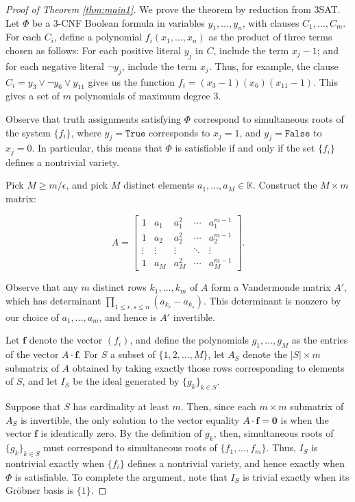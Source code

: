 \documentclass{article}
\newcommand{\K}[0]{\mathbb{K}}
\newcommand{\ep}[0]{\epsilon}
\begin{document}
\begin{proof}[Proof of Theorem \ref{thm:main1}]
We prove the theorem by reduction from 3SAT.  Let $\Phi$ be a 3\nobreakdash-CNF Boolean formula in variables $y_1,\ldots,y_n$, with clauses $C_1, \ldots, C_m$. For each $C_i$, define a polynomial $f_i(x_1,\ldots,x_n)$ as the product of three terms chosen as follows: For each positive literal $y_j$ in $C$, include the term $x_j-1$; and for each negative literal $\neg y_j$, include the term $x_j$. Thus, for example, the clause $C_i = y_3\vee \neg y_6\vee y_{11}$ gives us the function $f_i = (x_3 - 1)(x_6)(x_{11} - 1)$. This gives a set of $m$ polynomials of maximum degree 3.

Observe that truth assignments satisfying $\Phi$ correspond to simultaneous roots of the system $\{f_i\}$, where $y_j = \texttt{True}$ corresponds to $x_j = 1$, and $y_j = \texttt{False}$ to $x_j = 0$. In particular, this means that $\Phi$ is satisfiable if and only if the set $\{f_i\}$ defines a nontrivial variety.

Pick $M \ge m/\ep$, and pick $M$ distinct elements $a_1,\ldots,a_M \in \K$.  Construct the $M \times m$ matrix:

$$A = \left[\begin{array}{ccccc}
1 & a_1 & a_1^2 & \cdots & a_1^{m-1} \\
1 & a_2 & a_2^2 & \cdots & a_2^{m-1} \\
\vdots & \vdots & \vdots & \ddots & \vdots \\
1 & a_M & a_M^2 & \cdots & a_M^{m-1}
\end{array}\right].$$

Observe that any $m$ distinct rows $k_1,\ldots,k_m$ of $A$ form a Vandermonde matrix $A'$, which has determinant $\prod_{1\le r, s\le n} (a_{k_r} - a_{k_s})$.  This determinant is nonzero by our choice of $a_1, \ldots, a_m$, and hence is $A'$ invertible.

Let $\textbf{f}$ denote the vector $(f_i)$, and define the polynomials $g_1, \ldots, g_M$ as the entries of the vector $A\cdot \textbf{f}$.  For $S$ a subset of $\{1,2,\ldots, M\}$, let $A_S$ denote the $|S|\times m$ submatrix of $A$ obtained by taking exactly those rows corresponding to elements of $S$, and let $I_S$ be the ideal generated by $\{g_k\}_{k\in S}$.

Suppose that $S$ has cardinality at least $m$. Then, since each $m\times m$ submatrix of $A_S$ is invertible, the only solution to the vector equality $A\cdot \textbf{f} = \textbf{0}$ is when the vector $\textbf{f}$ is identically zero.  By the definition of $g_k$, then, simultaneous roots of $\{g_k\}_{k\in S}$ must correspond to simultaneous roots of $\{f_1,\ldots,f_m\}$.  Thus, $I_S$ is nontrivial exactly when $\{f_i\}$ defines a nontrivial variety, and hence exactly when $\Phi$ is satisfiable.  To complete the argument, note that $I_S$ is trivial exactly when its Gr\"obner basis is $\{1\}$.


\end{proof}
\end{document}
